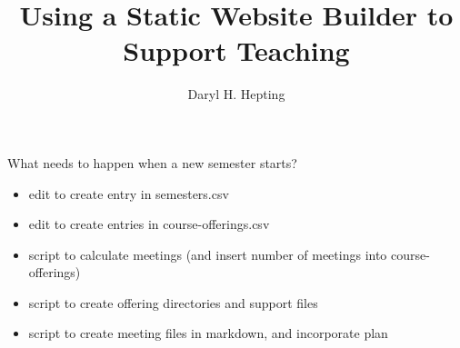 \documentclass[11pt]{amsart}
\title{Using a Static Website Builder to Support Teaching}
\author{Daryl H. Hepting}
\begin{document}
\maketitle

What needs to happen when a new semester starts?
\begin{itemize}
\item edit to create entry in semesters.csv
\item edit to create entries in course-offerings.csv
\item script to calculate meetings (and insert number of meetings into course-offerings)
\item script to create offering directories and support files
\item script to create meeting files in markdown, and incorporate plan
\end{itemize}

\section{}
\subsection{}
\end{document}

